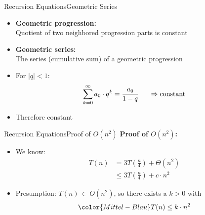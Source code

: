 \begin{frame}{Recursion Equations}{Geometric Series}
  \begin{itemize}
    \item<2->
      \textbf{Geometric progression:}\\
      Quotient of two neighbored progression parts is constant
    \item<3->
      \textbf{Geometric series:}\\
      The series (cumulative sum) of a geometric progression\\
    \item<4->  
      For $\mid q \mid < 1$:
      \begin{displaymath}
        \sum\limits^{\infty}_{k=0} a_0 \cdot q^k = \dfrac{a_0}{1 - q}
        \hspace{1.5em}\Rightarrow\text{constant}
      \end{displaymath}
    \item<5->
      Therefore constant
  \end{itemize}
\end{frame}


\begin{frame}{Recursion Equations}{Proof of $O(n^2)$}
  \textbf{Proof of $O(n^2)$:}
  \begin{itemize}
    \item<2->
      We know:
      \begin{align*}
        T(n) &= 3T\left(\frac{n}{4}\right) + \Theta(n^2)\\
        {} &\leq 3T \left(\frac{n}{4}\right) + c \cdot n^2
      \end{align*}
    \item<3->
      Presumption:
      {\color{Mittel-Blau}$T(n) \, \in \, O(n^2)$},
      so there exists a {\color{Mittel-Blau}$k > 0$} with
      \begin{displaymath}
        \color{Mittel-Blau}
        T(n) \leq k \cdot n^2
      \end{displaymath}
  \end{itemize}
\end{frame}


